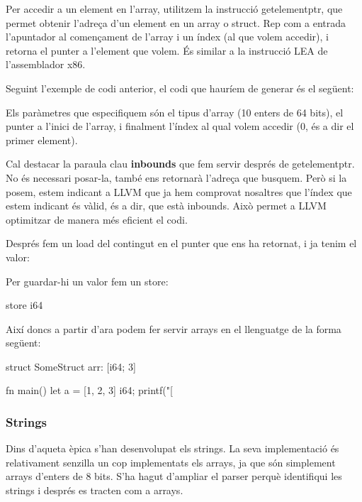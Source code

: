 ﻿\documentclass{article}
\begin{document}
Per accedir a un element en l'array, utilitzem la instrucció getelementptr, que
permet obtenir l'adreça d'un element en un array o struct. Rep com a entrada
l'apuntador al començament de l'array i un índex (al que volem accedir), i
retorna el punter a l'element que volem. És similar a la instrucció
LEA \cite{lea} de l'assemblador
x86.

Seguint l'exemple de codi anterior, el codi que hauríem de generar és el següent:

\begin{code}
\end{code}

Els paràmetres que especifiquem són el tipus d'array (10 enters de 64 bits), el
punter a l'inici de l'array, i finalment l'índex al qual volem accedir (0, és a
dir el primer element).

Cal destacar la paraula clau \textbf{inbounds} que fem servir després de
getelementptr. No és necessari posar-la, també ens retornarà l'adreça que
busquem. Però si  la posem, estem indicant a LLVM que ja hem comprovat nosaltres
que l'índex que estem indicant és vàlid, és a dir, que està inbounds. Això
permet a LLVM optimitzar de manera més eficient el codi.

Després fem un load del contingut en el punter que ens ha retornat, i ja tenim
el valor:

\begin{code}
\end{code}

Per guardar-hi un valor fem un store:

\begin{code}
store i64 %
\end{code}

Així doncs a partir d'ara podem fer servir arrays en el llenguatge de la forma
següent:

\begin{code}
struct SomeStruct {
    arr: [i64; 3]
}

fn main() {
    let a = [1, 2, 3] i64;
    printf("[%
}
\end{code}

\subsubsection{Strings}
Dins d'aqueta èpica s'han desenvolupat els strings. La seva implementació és
relativament senzilla un cop implementats els arrays, ja que són simplement
arrays d'enters de 8 bits. S'ha hagut d'ampliar el parser perquè identifiqui les
strings i després es tracten com a arrays.
\end{document}
